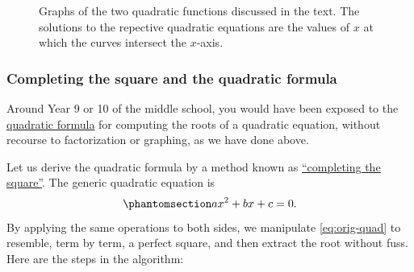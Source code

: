 \documentclass[
  a4paper,
]{article}
\begin{document}
\begin{figure}
\centering

\caption{Graphs of the two quadratic functions discussed in the text.
The solutions to the repective quadratic equations are the values of
\(x\) at which the curves intersect the
\(x\)-axis.}\label{fig:quadratic-graphs}
\end{figure}

\subsubsection{Completing the square and the quadratic
formula}\label{completing-the-square-and-the-quadratic-formula}

Around Year 9 or 10 of the middle school, you would have been exposed to
the \href{https://en.wikipedia.org/wiki/Quadratic_formula}{quadratic
formula} for computing the roots of a quadratic equation, without
recourse to factorization or graphing, as we have done above.

Let us derive the quadratic formula by a method known as
\href{https://en.wikipedia.org/wiki/Completing_the_square}{``completing
the square''}. The generic quadratic equation is
\begin{equation}\phantomsection\label{eq:orig-quad}{
ax^2 + bx + c = 0.
}\end{equation} By applying the same operations to both sides, we
manipulate \cref{eq:orig-quad} to resemble, term by term, a perfect
square, and then extract the root without fuss. Here are the steps in
the algorithm:
\end{document}
